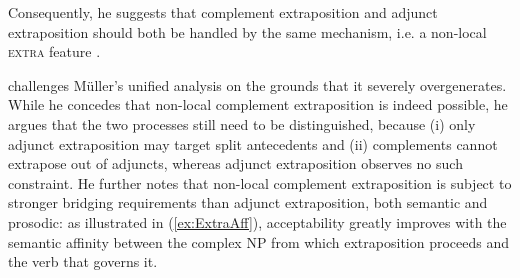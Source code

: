 \documentclass[output=paper
                ,modfonts
                ,nonflat
	        ,collection
	        ,collectionchapter
	        ,collectiontoclongg
 	        ,biblatex
                ,babelshorthands
                ,newtxmath
                ,draftmode
                ,colorlinks, citecolor=brown
]{./langsci/langscibook}
\begin{document}
{\begin{exe}
\begin{xlist}
  \end{xlist}
\end{exe}

Consequently, he suggests that complement extraposition and adjunct
extraposition should both be handled by the same mechanism, i.e. a non-local
\textsc{extra} feature \citep{Keller:95,Mueller99}. 

\citet{crysmann_b09xtra} challenges Müller's unified analysis on the
grounds that it severely overgenerates.  While he concedes that
non-local complement extraposition is indeed possible, he argues that
the two processes still need to be distinguished, because (i) only
adjunct extraposition may target split antecedents and (ii)
complements cannot extrapose out of adjuncts, whereas adjunct
extraposition observes no such constraint.  He further notes that
non-local complement extraposition is subject to stronger bridging
requirements than adjunct extraposition, both semantic and prosodic:
as illustrated in (\ref{ex:ExtraAff}), acceptability greatly improves
with the semantic affinity between the complex NP from which
extraposition proceeds and the verb that governs it.

\begin{exe}
  \ex \label{ex:ExtraAff}
  \begin{xlist}
    
  \end{xlist}
\end{exe}

\begin{exe}
\ex \label{ex:RemnantSemantic}
\begin{xlist}
\end{xlist}
\end{exe}

}
\end{document}
